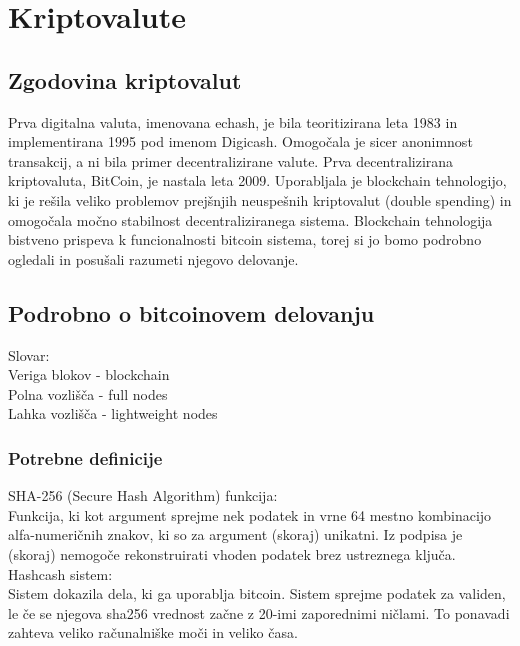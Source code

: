 \documentclass[letterpaper, titlepage, freqn]{article}
\begin{document}
\section{Kriptovalute}

\subsection{Zgodovina kriptovalut}

Prva digitalna valuta, imenovana echash, je bila teoritizirana leta 1983 in implementirana 1995 pod imenom Digicash. Omogočala je sicer anonimnost transakcij, a ni bila primer decentralizirane valute.
Prva decentralizirana kriptovaluta, BitCoin, je nastala leta 2009. Uporabljala je blockchain tehnologijo, ki je rešila veliko problemov prejšnjih neuspešnih kriptovalut (double spending) in omogočala močno stabilnost decentraliziranega sistema. Blockchain tehnologija bistveno prispeva  k funcionalnosti bitcoin sistema, torej si jo bomo podrobno ogledali in posušali razumeti njegovo delovanje.\\

\subsection{Podrobno o bitcoinovem delovanju}

Slovar:\\
Veriga blokov - blockchain\\
Polna vozlišča - full nodes\\
Lahka vozlišča - lightweight nodes\\
 
\subsubsection{Potrebne definicije}
 
SHA-256 (Secure Hash Algorithm) funkcija:\\
Funkcija, ki kot argument sprejme nek podatek in vrne 64 mestno kombinacijo alfa-numeričnih znakov, ki so za argument (skoraj) unikatni. Iz podpisa je (skoraj) nemogoče rekonstruirati vhoden podatek brez ustreznega ključa.\\

Hashcash sistem:\\
Sistem dokazila dela, ki ga uporablja bitcoin. Sistem sprejme podatek za validen, le če se njegova sha256 vrednost začne z 20-imi zaporednimi ničlami. To ponavadi zahteva veliko računalniške moči in veliko časa.\\
 
\end{document}
